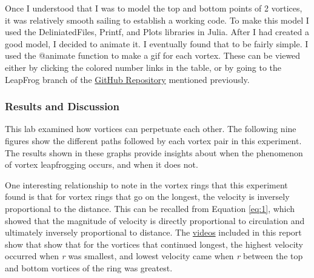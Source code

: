 \documentclass{article}
\begin{document}
Once I understood that I was to model the top and bottom points of 2 vortices, it was relatively smooth sailing to establish a working code. To make this model I used the DeliniatedFiles, Printf, and Plots libraries in Julia. After I had created a good model, I decided to animate it. I eventually found that to be fairly simple. I used the \textcolor{Dandelion}{@animate} function to make a gif for each vortex. These can be viewed either by clicking the colored number links in the table, or by going to the LeapFrog branch of the \href{https://github.com/JoeSpencer1/497R-Projects.git}{GitHub Repository} mentioned previously. \newline

\subsubsection*{Results and Discussion}

This lab examined how vortices can perpetuate each other. The following nine figures show the different paths followed by each vortex pair in this experiment. The results shown in these graphs provide insights about when the phenomenon of vortex leapfrogging occurs, and when it does not.\newline

One interesting relationship to note in the vortex rings that this experiment found is that for vortex rings that go on the longest, the velocity is inversely proportional to the distance. This can be recalled from Equation \ref{eq:1}, which showed that the magnitude of velocity is directly proportional to circulation and ultimately inversely proportional to distance. The 
\href{https://imgur.com/U4cND6X,}{videos} included in this report show that show that for the vortices that continued longest, the highest velocity occurred when \emph{r} was smallest, and lowest velocity came when \emph{r} between the top and bottom vortices of the ring was greatest. \newline

\clearpage
\end{document}
